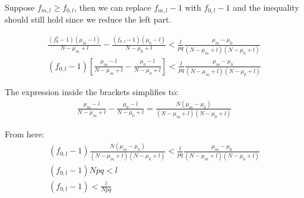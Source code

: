 \documentclass[11pt,draft]{article}
\begin{document}
Suppose $f_{m,l} \ge f_{0,l}$, then we can replace $f_{m,l} - 1$ with $f_{0,l} - 1$ and the inequality should still hold since we reduce the left part.

\begin{align}
\frac{(f^x_0 - 1)(\mu_m - l)}{N-\mu_m + l}  - \frac{(f_{0,l} - 1)(\mu_0 - l)}{N-\mu_0 + l} < \frac{l}{pq} \frac{\mu_m - \mu_0}{(N-\mu_m + l)(N-\mu_0 + l)} \\
(f_{0,l} - 1) \left [ \frac{\mu_m - l}{N-\mu_m + l}  - \frac{\mu_0 - l}{N-\mu_0 + l} \right ] < \frac{l}{pq} \frac{\mu_m - \mu_0}{(N-\mu_m + l)(N-\mu_0 + l)}
\end{align}

The expression inside the brackets simplifies to:
\begin{align}
\frac{\mu_m - l}{N-\mu_m + l}  - \frac{\mu_0 - l}{N-\mu_0 + l} = \frac{N(\mu_m-\mu_0)}{(N-\mu_m + l)(N-\mu_0 + l)}
\end{align}

From here:
\begin{align}
(f_{0,l} - 1) \frac{N(\mu_m-\mu_0)}{(N-\mu_m + l)(N-\mu_0 + l)} < \frac{l}{pq} \frac{\mu_m - \mu_0}{(N-\mu_m + l)(N-\mu_0 + l)} \\
(f_{0,l} - 1)Npq < l \\
(f_{0,l} - 1) < \frac{l}{Npq}
\end{align}
\end{document}
